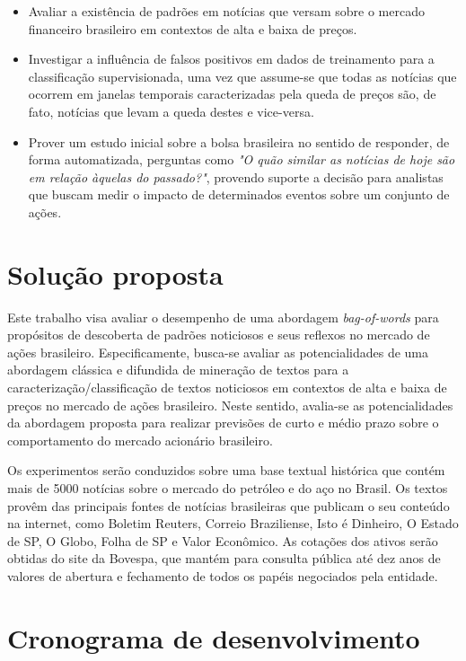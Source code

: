 \documentclass[11pt,a4paper]{article}
\begin{document}
\begin{itemize}
  \item Avaliar a existência de padrões em notícias que versam sobre o mercado financeiro
    brasileiro em contextos de alta e baixa de preços.
  \item Investigar a influência de falsos positivos em dados de treinamento para a classificação
    supervisionada, uma vez que assume-se que todas as notícias que ocorrem em janelas temporais
    caracterizadas pela queda de preços são, de fato, notícias que levam a queda destes e vice-versa.
  \item Prover um estudo inicial sobre a bolsa brasileira no sentido de responder, de forma
    automatizada, perguntas como \textit{"O quão similar as notícias de hoje são em relação àquelas do passado?"},
    provendo suporte a decisão para analistas que buscam medir o impacto de determinados eventos sobre um conjunto de ações.
\end{itemize}

\section{Solução proposta}

Este trabalho visa avaliar o desempenho de uma abordagem \textit{bag-of-words} \cite{Manning:IR}
para propósitos de descoberta de padrões noticiosos e seus reflexos no mercado de ações brasileiro.
Especificamente, busca-se avaliar as potencialidades de uma abordagem clássica e difundida de mineração
de textos para a caracterização/classificação de textos noticiosos em contextos de alta e baixa de
preços no mercado de ações brasileiro. Neste sentido, avalia-se as potencialidades da abordagem proposta
para realizar previsões de curto e médio prazo sobre o comportamento do mercado acionário brasileiro.

Os experimentos serão conduzidos sobre uma base textual histórica que contém mais de 5000 notícias
sobre o mercado do petróleo e do aço no Brasil. Os textos provêm das principais fontes de notícias
brasileiras que publicam o seu conteúdo na internet, como Boletim Reuters, Correio Braziliense, Isto é Dinheiro,
O Estado de SP, O Globo, Folha de SP e Valor Econômico. As cotações dos ativos serão obtidas do site da Bovespa,
que mantém para consulta pública até dez anos de valores de abertura e fechamento de todos os papéis negociados pela entidade.


\section{Cronograma de desenvolvimento}\label{sec:cronograma}
\end{document}
